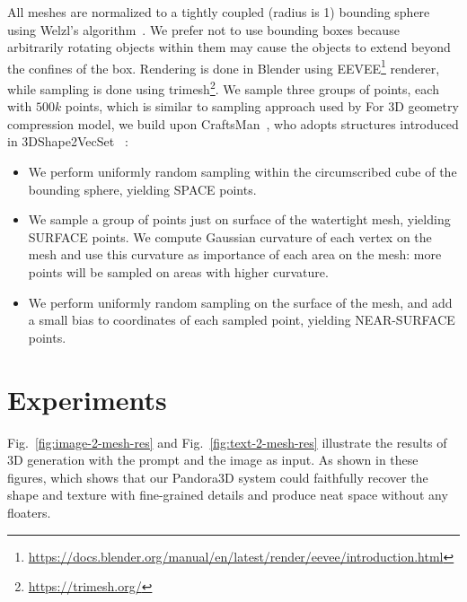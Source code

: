 All meshes are normalized to a tightly coupled (radius is 1) bounding sphere using Welzl's algorithm~\cite{welzl2005smallest}. We prefer not to use bounding boxes because arbitrarily rotating objects within them may cause the objects to extend beyond the confines of the box. 
Rendering is done in Blender using EEVEE\footnote{\url{https://docs.blender.org/manual/en/latest/render/eevee/introduction.html}} renderer, while sampling is done using trimesh\footnote{\url{https://trimesh.org/}}. 
We sample three groups of points, each with $500k$ points, which is similar to sampling approach used by For 3D geometry compression model, we build upon CraftsMan~\cite{li2024craftsman}, who adopts structures introduced in 3DShape2VecSet ~\cite{zhang20233dshape2vecset}:
\begin{itemize}
    \item We perform uniformly random sampling within the circumscribed cube of the bounding sphere, yielding SPACE points.
    \item We sample a group of points just on surface of the watertight mesh, yielding SURFACE points. We compute Gaussian curvature of each vertex on the mesh and use this curvature as importance of each area on the mesh: more points will be sampled on areas with higher curvature. 
    \item We perform uniformly random sampling on the surface of the mesh, and add a small bias to coordinates of each sampled point, yielding NEAR-SURFACE points.
\end{itemize}


\section{Experiments}



Fig.~\ref{fig:image-2-mesh-res} and Fig.~\ref{fig:text-2-mesh-res} illustrate the results of 3D generation with the prompt and the image as input. As shown in these figures, which shows that our Pandora3D system could faithfully recover the shape and texture with fine-grained details and produce neat space without any floaters.

